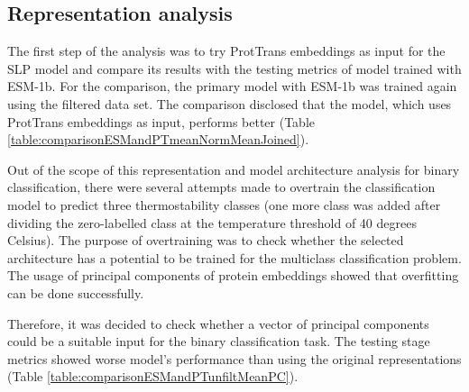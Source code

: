 \documentclass[12pt]{article}
\begin{document}
	\newpage

	\subsection{Representation analysis}

	The first step of the analysis was to try ProtTrans embeddings 
	as input for the SLP model and compare 
	its results with the testing metrics of model trained with 
	ESM-1b. For the comparison, the primary model with ESM-1b was 
	trained again using the filtered data set. The comparison disclosed 
	that the model, which uses ProtTrans embeddings as input, performs 
	better (Table \ref{table:comparisonESMandPTmeanNormMeanJoined}).

	Out of the scope of this representation and model architecture analysis
	for binary classification, there were several attempts made to overtrain
	the classification model to predict three thermostability classes (one 
	more class was added after dividing the zero-labelled class at the temperature
	threshold of 40 degrees Celsius). The purpose of overtraining was to check 
	whether the selected architecture has a potential to be trained for the 
	multiclass classification problem. The usage of principal 
	components of protein embeddings showed that overfitting can be 
	done successfully.

	Therefore, it was decided to check whether 
	a vector of principal components could be a suitable input for the binary 
	classification task. The testing stage metrics showed worse model's performance 
	than using the original representations (Table \ref{table:comparisonESMandPTunfiltMeanPC}). 
\end{document}
